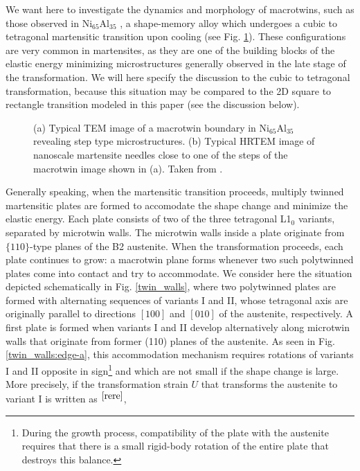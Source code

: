 \documentclass[twocolumn,amsmath,amssymb]{revtex4}
\begin{document}
We want here to investigate the dynamics and morphology of macrotwins, such as those observed in Ni$_{65}$Al$_{35}$ \cite{SchEtAl02,Boullay:2001rw,SchBouKohBal01}, a shape-memory alloy which undergoes a cubic to tetragonal martensitic transition upon cooling (see Fig. \ref{macrotwin_in_NiAl}). These configurations are very common in martensites, as they are one of the building blocks of the elastic energy minimizing microstructures generally observed in the late stage of the transformation. We will here specify the discussion to the cubic to tetragonal transformation, because this situation may be compared to the 2D square to rectangle transition modeled in this paper (see the discussion below). 
%
\begin{figure}
\begin{center}
\hspace{.5cm}
\end{center}
\caption{\label{macrotwin_in_NiAl}(a) Typical TEM image of a macrotwin boundary in Ni$_{65}$Al$_{35}$ revealing step type microstructures. (b) Typical HRTEM image of nanoscale martensite needles close to one of the steps of the macrotwin image shown in (a). Taken from  \cite{Boullay:2001rw}. }
\end{figure}
%
%
Generally speaking, when the martensitic transition proceeds, multiply twinned martensitic plates are formed to accomodate the shape change and minimize the elastic energy. Each plate consists of two of the three tetragonal L1$_0$  variants, separated by microtwin walls. The microtwin walls inside a plate originate from $\{110\}$-type planes of the B2 austenite. When the transformation proceeds, each plate continues to grow: a macrotwin plane forms whenever two such polytwinned plates come into contact and try to accommodate. We consider here the situation depicted schematically in Fig. \ref{twin_walls}, where two polytwinned plates are formed with alternating sequences of variants I and II, whose tetragonal axis are originally parallel to directions $[100]$ and $[010]$ of the austenite, respectively. A first plate is formed when variants I and II develop alternatively along microtwin walls that originate from former (110) planes of the austenite. As seen in Fig. \ref{twin_walls:edge-a}, this accommodation mechanism requires rotations of variants I and II opposite in sign\footnote{\label{rere}During the growth process, compatibility of the plate with the austenite requires that there is a small rigid-body rotation of the entire plate that destroys this balance.} and which are not small if the shape change is large. More precisely, if  the transformation strain $U$ that transforms the austenite to variant I is written as $^{\ref{rere}}$,
\end{document}
